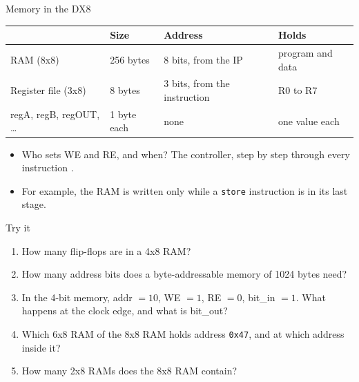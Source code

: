 \documentclass[10pt]{wosm-slides}
\begin{document}
\begin{frame}{Memory in the DX8}
  \begin{center}
    \begin{tabular}{@{}llll@{}}
      \toprule
       & Size & Address & Holds \\
      \midrule
      RAM (8x8) & 256 bytes & 8 bits, from the IP & program and data \\
      Register file (3x8) & 8 bytes & 3 bits, from the instruction & R0 to R7 \\
      regA, regB, regOUT, \ldots & 1 byte each & none & one value each \\
      \bottomrule
    \end{tabular}
  \end{center}

  \begin{itemize}
    \item Who sets WE and RE, and when? The controller, step by step through every
      instruction .
    \item For example, the RAM is written only while a \texttt{store} instruction is
      in its last stage.
  \end{itemize}
\end{frame}

\begin{frame}{Try it}
  \begin{enumerate}
    \item How many flip-flops are in a 4x8 RAM?\par
    \item How many address bits does a byte-addressable memory of 1024 bytes need?\par
    \item In the 4-bit memory, addr $= 10$, WE $= 1$, RE $= 0$, bit\_in $= 1$. What
      happens at the clock edge, and what is bit\_out?\par
    \item Which 6x8 RAM of the 8x8 RAM holds address \texttt{0x47}, and at which
      address inside it?\par
    \item How many 2x8 RAMs does the 8x8 RAM contain?\par
  \end{enumerate}
\end{frame}
\end{document}
